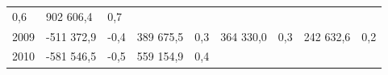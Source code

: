 \begin{longtable}[]{@{}lllllllll@{}}
\begin{minipage}[t]{0.06\columnwidth}
0,6\strut
\end{minipage} & \begin{minipage}[t]{0.10\columnwidth}\raggedright
902 606,4\strut
\end{minipage} & \begin{minipage}[t]{0.06\columnwidth}\raggedright
0,7\strut
\end{minipage}\tabularnewline
\begin{minipage}[t]{0.05\columnwidth}\raggedright
2009\strut
\end{minipage} & \begin{minipage}[t]{0.10\columnwidth}\raggedright
-511 372,9\strut
\end{minipage} & \begin{minipage}[t]{0.06\columnwidth}\raggedright
-0,4\strut
\end{minipage} & \begin{minipage}[t]{0.16\columnwidth}\raggedright
389 675,5\strut
\end{minipage} & \begin{minipage}[t]{0.06\columnwidth}\raggedright
0,3\strut
\end{minipage} & \begin{minipage}[t]{0.12\columnwidth}\raggedright
364 330,0\strut
\end{minipage} & \begin{minipage}[t]{0.06\columnwidth}\raggedright
0,3\strut
\end{minipage} & \begin{minipage}[t]{0.10\columnwidth}\raggedright
242 632,6\strut
\end{minipage} & \begin{minipage}[t]{0.06\columnwidth}\raggedright
0,2\strut
\end{minipage}\tabularnewline
\begin{minipage}[t]{0.05\columnwidth}\raggedright
2010\strut
\end{minipage} & \begin{minipage}[t]{0.10\columnwidth}\raggedright
-581 546,5\strut
\end{minipage} & \begin{minipage}[t]{0.06\columnwidth}\raggedright
-0,5\strut
\end{minipage} & \begin{minipage}[t]{0.16\columnwidth}\raggedright
559 154,9\strut
\end{minipage} & \begin{minipage}[t]{0.06\columnwidth}\raggedright
0,4\strut
\end{minipage} & \begin{minipage}[t]{0.12\columnwidth}\raggedright

\end{minipage}
\end{longtable}
